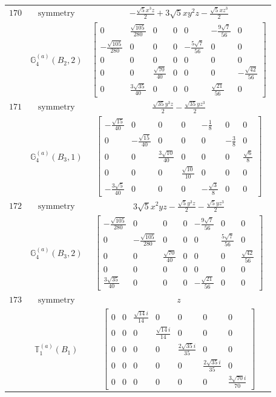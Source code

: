 \documentclass[fleqn,8pt,landscape]{jsarticle}
\begin{document}
\begin{longtable}{ccc}
$ 170 $ & $ \text{symmetry} $ & $ - \frac{\sqrt{5} x^{3} z}{2} + 3 \sqrt{5} x y^{2} z - \frac{\sqrt{5} x z^{3}}{2} $ \\
$  $ & $ \mathbb{G}_{4}^{(a)}(B_{2},2) $ & $ \begin{bmatrix} 0 & \frac{\sqrt{105}}{280} & 0 & 0 & 0 & - \frac{9 \sqrt{7}}{56} & 0 \\ - \frac{\sqrt{105}}{280} & 0 & 0 & 0 & - \frac{5 \sqrt{7}}{56} & 0 & 0 \\ 0 & 0 & 0 & 0 & 0 & 0 & 0 \\ 0 & 0 & \frac{\sqrt{70}}{40} & 0 & 0 & 0 & - \frac{\sqrt{42}}{56} \\ 0 & \frac{3 \sqrt{35}}{40} & 0 & 0 & 0 & \frac{\sqrt{21}}{56} & 0 \end{bmatrix} $ \\ \hline
$ 171 $ & $ \text{symmetry} $ & $ \frac{\sqrt{35} y^{3} z}{2} - \frac{\sqrt{35} y z^{3}}{2} $ \\
$  $ & $ \mathbb{G}_{4}^{(a)}(B_{3},1) $ & $ \begin{bmatrix} - \frac{\sqrt{15}}{40} & 0 & 0 & 0 & - \frac{1}{8} & 0 & 0 \\ 0 & - \frac{\sqrt{15}}{40} & 0 & 0 & 0 & - \frac{3}{8} & 0 \\ 0 & 0 & \frac{3 \sqrt{10}}{40} & 0 & 0 & 0 & \frac{\sqrt{6}}{8} \\ 0 & 0 & 0 & \frac{\sqrt{10}}{10} & 0 & 0 & 0 \\ - \frac{3 \sqrt{5}}{40} & 0 & 0 & 0 & - \frac{\sqrt{3}}{8} & 0 & 0 \end{bmatrix} $ \\ \hline
$ 172 $ & $ \text{symmetry} $ & $ 3 \sqrt{5} x^{2} y z - \frac{\sqrt{5} y^{3} z}{2} - \frac{\sqrt{5} y z^{3}}{2} $ \\
$  $ & $ \mathbb{G}_{4}^{(a)}(B_{3},2) $ & $ \begin{bmatrix} - \frac{\sqrt{105}}{280} & 0 & 0 & 0 & - \frac{9 \sqrt{7}}{56} & 0 & 0 \\ 0 & - \frac{\sqrt{105}}{280} & 0 & 0 & 0 & \frac{5 \sqrt{7}}{56} & 0 \\ 0 & 0 & \frac{\sqrt{70}}{40} & 0 & 0 & 0 & \frac{\sqrt{42}}{56} \\ 0 & 0 & 0 & 0 & 0 & 0 & 0 \\ \frac{3 \sqrt{35}}{40} & 0 & 0 & 0 & - \frac{\sqrt{21}}{56} & 0 & 0 \end{bmatrix} $ \\ \hline
$ 173 $ & $ \text{symmetry} $ & $ z $ \\
$  $ & $ \mathbb{T}_{1}^{(a)}(B_{1}) $ & $ \begin{bmatrix} 0 & 0 & \frac{\sqrt{14} i}{14} & 0 & 0 & 0 & 0 \\ 0 & 0 & 0 & \frac{\sqrt{14} i}{14} & 0 & 0 & 0 \\ 0 & 0 & 0 & 0 & \frac{2 \sqrt{35} i}{35} & 0 & 0 \\ 0 & 0 & 0 & 0 & 0 & \frac{2 \sqrt{35} i}{35} & 0 \\ 0 & 0 & 0 & 0 & 0 & 0 & \frac{3 \sqrt{70} i}{70} \end{bmatrix} $ \\ \hline

\end{longtable}
\end{document}
